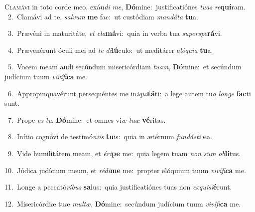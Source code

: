 \lettrine{\initial\textcolor{\initialcolor}{C}}{lamávi} in toto corde meo, exáu\textit{di} \textit{me}\-, \textbf{Dó}\-mine:~\star justificatiónes \textit{tu}\-\textit{as} \textit{re}\-\textbf{quí}ram.\\
{\numbfont\textcolor{\numbcolor}{~2.}}~Clamávi ad te, \textit{sal}\-\textit{vum} \textbf{me} fac:~\star ut custódiam \textit{man}\-\textit{dá}\textit{ta} \textbf{tu}\-a.\par
{\numbfont\textcolor{\numbcolor}{~3.}}~Prævéni in maturitáte, \textit{et} \textit{cla}\-\textbf{má}vi:~\star quia in verba tua \textit{su}\-\textit{per}\textit{spe}\textbf{rá}vi.\par
{\numbfont\textcolor{\numbcolor}{~4.}}~Prævenérunt óculi mei ad \textit{te} \textit{di}\-\textbf{lú}culo:~\star ut meditárer e\-\textit{ló}\-\textit{qui}\textit{a} \textbf{tu}\-a.\par
{\numbfont\textcolor{\numbcolor}{~5.}}~Vocem meam audi secúndum misericórdiam \textit{tu}\-\textit{am}, \textbf{Dó}\-mine:~\star et secúndum judícium tuum \textit{vi}\-\textit{ví}\textit{fi}\textbf{ca} me.\par
{\numbfont\textcolor{\numbcolor}{~6.}}~Appropinquavérunt persequéntes me in\-\textit{i}\-\textit{qui}\textbf{tá}ti:~\star a lege autem tu\textit{a} \textit{lon}\-\textit{ge} \textbf{fac}\-ti sunt.\par
{\numbfont\textcolor{\numbcolor}{~7.}}~Prope \textit{es} \textit{tu}\-, \textbf{Dó}\-mine:~\star et omnes vi\textit{æ} \textit{tu}\-\textit{æ} \textbf{vé}\-ritas.\par
{\numbfont\textcolor{\numbcolor}{~8.}}~Inítio cognóvi de testimó\-\textit{ni}\-\textit{is} \textbf{tu}\-is:~\star quia in ætérnum \textit{fun}\-\textit{dás}\textit{ti} \textbf{e}\-a.\par
{\numbfont\textcolor{\numbcolor}{~9.}}~Vide humilitátem meam, et \textit{é}\-\textit{ri}\textbf{pe} me:~\star quia legem tuam \textit{non} \textit{sum} \textit{ob}\-\textbf{lí}tus.\par
{\numbfont\textcolor{\numbcolor}{10.}}~Júdica judícium meum, et \textit{réd}\-\textit{i}\textbf{me} me:~\star propter elóquium tuum \textit{vi}\-\textit{ví}\textit{fi}\textbf{ca} me.\par
{\numbfont\textcolor{\numbcolor}{11.}}~Longe a peccató\-\textit{ri}\-\textit{bus} \textbf{sa}\-lus:~\star quia justificatiónes tuas non \textit{ex}\-\textit{qui}\textit{si}\textbf{é}runt.\par
{\numbfont\textcolor{\numbcolor}{12.}}~Misericórdiæ tuæ \textit{mul}\-\textit{tæ}, \textbf{Dó}\-mine:~\star secúndum judícium tuum \textit{vi}\-\textit{ví}\textit{fi}\textbf{ca} me.\par
